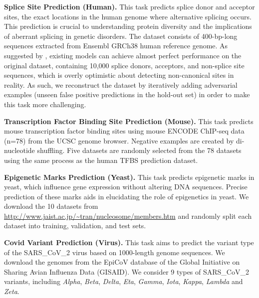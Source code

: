 \textbf{Splice Site Prediction (Human).}\quad
This task predicts splice donor and acceptor sites, the exact locations in the human genome where alternative splicing occurs. This prediction is crucial to understanding protein diversity and the implications of aberrant splicing in genetic disorders. The dataset \citep{BMC2021spliceator} consists of 400-bp-long sequences extracted from Ensembl GRCh38 human reference genome. As suggested by \citet{BioInfo2021dnabert}, existing models can achieve almost perfect performance on the original dataset, containing 10,000 splice donors, acceptors, and non-splice site sequences, which is overly optimistic about detecting non-canonical sites in reality. As such, we reconstruct the dataset by iteratively adding adversarial examples (unseen false positive predictions in the hold-out set) in order to make this task more challenging.  
 
\textbf{Transcription Factor Binding Site Prediction (Mouse).}\quad
This task predicts mouse transcription factor binding sites using mouse ENCODE ChIP-seq data (n=78) \citep{mouse2012ChIPseq} from the UCSC genome browser. Negative examples are created by di-nucleotide shuffling. Five datasets are randomly selected from the 78 datasets using the same process as the human TFBS prediction dataset.

\textbf{Epigenetic Marks Prediction (Yeast).}\quad
This task predicts epigenetic marks in yeast, which influence gene expression without altering DNA sequences. Precise prediction of these marks aids in elucidating the role of epigenetics in yeast. We download the 10 datasets from \url{http://www.jaist.ac.jp/~tran/nucleosome/members.htm} and randomly split each dataset into training, validation, and test sets.

\textbf{Covid Variant Prediction (Virus).}\quad
This task aims to predict the variant type of the SARS\_CoV\_2 virus based on 1000-length genome sequences. We download the genomes from the EpiCoV database \citep{khare202SARS_CoV_2} of the Global Initiative on Sharing Avian Influenza Data (GISAID). We consider 9 types of SARS\_CoV\_2 variants, including \textit{Alpha}, \textit{Beta}, \textit{Delta}, \textit{Eta}, \textit{Gamma}, \textit{Iota}, \textit{Kappa}, \textit{Lambda} and \textit{Zeta}.




